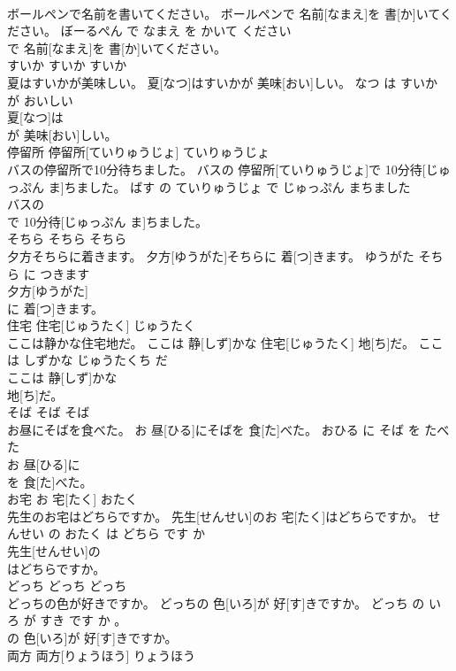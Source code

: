 \documentclass[8pt]{extreport}
\begin{document}
\begin{CJK}{UTF8}{min}
\\	ボールペンで名前を書いてください。	ボールペンで 名前[なまえ]を 書[か]いてください。	ぼーるぺん で なまえ を かいて ください	
\\	で 名前[なまえ]を 書[か]いてください。			
\\	すいか	すいか	すいか	
\\	夏はすいかが美味しい。	夏[なつ]はすいかが 美味[おい]しい。	なつ は すいか が おいしい	
\\	夏[なつ]は
\\	が 美味[おい]しい。			
\\	停留所	停留所[ていりゅうじょ]	ていりゅうじょ	
\\	バスの停留所で10分待ちました。	バスの 停留所[ていりゅうじょ]で 10分待[じゅっぷん ま]ちました。	ばす の ていりゅうじょ で じゅっぷん まちました	
\\	バスの
\\	で 10分待[じゅっぷん ま]ちました。			
\\	そちら	そちら	そちら	
\\	夕方そちらに着きます。	夕方[ゆうがた]そちらに 着[つ]きます。	ゆうがた そちら に つきます	
\\	夕方[ゆうがた]
\\	に 着[つ]きます。			
\\	住宅	住宅[じゅうたく]	じゅうたく	
\\	ここは静かな住宅地だ。	ここは 静[しず]かな 住宅[じゅうたく] 地[ち]だ。	ここ は しずかな じゅうたくち だ	
\\	ここは 静[しず]かな
\\	地[ち]だ。			
\\	そば	そば	そば	
\\	お昼にそばを食べた。	お 昼[ひる]にそばを 食[た]べた。	おひる に そば を たべた	
\\	お 昼[ひる]に
\\	を 食[た]べた。			
\\	お宅	お 宅[たく]	おたく	
\\	先生のお宅はどちらですか。	先生[せんせい]のお 宅[たく]はどちらですか。	せんせい の おたく は どちら です か	
\\	先生[せんせい]の
\\	はどちらですか。			
\\	どっち	どっち	どっち	
\\	どっちの色が好きですか。	どっちの 色[いろ]が 好[す]きですか。	どっち の いろ が すき です か 。	
\\	の 色[いろ]が 好[す]きですか。			
\\	両方	両方[りょうほう]	りょうほう	

\end{CJK}
\end{document}
